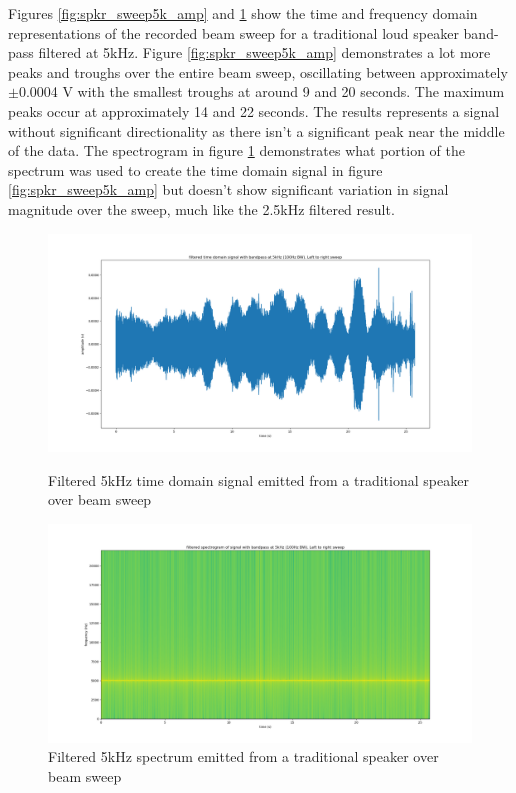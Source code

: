 Figures \ref{fig:spkr_sweep5k_amp} and \ref{fig:spkr_sweep5k_spectro} show the time and frequency domain representations of the recorded beam sweep for a traditional loud speaker band-pass filtered at 5kHz. Figure \ref{fig:spkr_sweep5k_amp} demonstrates a lot more peaks and troughs over the entire beam sweep, oscillating between approximately $\pm$0.0004 V with the smallest troughs at around 9 and 20 seconds. The maximum peaks occur at approximately 14 and 22 seconds. The results represents a signal without significant directionality as there isn't a significant peak near the middle of the data. The spectrogram in figure \ref{fig:spkr_sweep5k_spectro} demonstrates what portion of the spectrum was used to create the time domain signal in figure \ref{fig:spkr_sweep5k_amp} but doesn't show significant variation in signal magnitude over the sweep, much like the 2.5kHz filtered result.
\begin{figure}[ht!]
    \centering
    \begin{minipage}{0.49\textwidth}
        \centering
        \includegraphics[width=\textwidth]{Figures/Testing/BeamSweep/Classical_speaker/5k_amp_sweep_spkr.png}
        \caption{Filtered 5kHz time domain signal emitted from a traditional speaker over beam sweep}
        \label{fig:spkr_sweep5k_amp}
    \end{minipage}\hfill
    \begin{minipage}{0.49\textwidth}
        \centering
        \includegraphics[width=\textwidth]{Figures/Testing/BeamSweep/Classical_speaker/5k_freq_sweep_spkr.png}
        \caption{Filtered 5kHz spectrum emitted from a traditional speaker over beam sweep}
        \label{fig:spkr_sweep5k_spectro}
    \end{minipage}
\end{figure}

